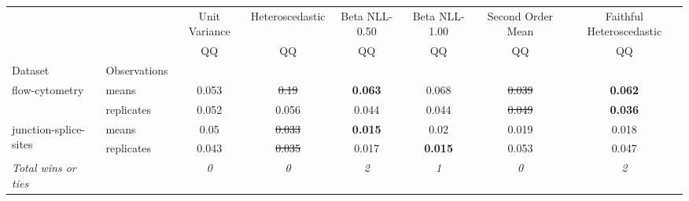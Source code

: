 \begin{tabular}{ll|c|c|c|c|c|c}
\toprule
{} & {} & {Unit Variance} & {Heteroscedastic} & {Beta NLL-0.50} & {Beta NLL-1.00} & {Second Order Mean} & {Faithful Heteroscedastic} \\
{} & {} & {QQ} & {QQ} & {QQ} & {QQ} & {QQ} & {QQ} \\
{Dataset} & {Observations} & {} & {} & {} & {} & {} & {} \\
\midrule
\multirow[t]{2}{*}{flow-cytometry} & means & 0.053 & \sout{0.19} & \textbf{0.063} & 0.068 & \sout{0.039} & \textbf{0.062} \\
 & replicates & 0.052 & 0.056 & 0.044 & 0.044 & \sout{0.049} & \textbf{0.036} \\
\multirow[t]{2}{*}{junction-splice-sites} & means & 0.05 & \sout{0.033} & \textbf{0.015} & 0.02 & 0.019 & 0.018 \\
 & replicates & 0.043 & \sout{0.035} & 0.017 & \textbf{0.015} & 0.053 & 0.047 \\
\textit{{Total wins or ties}} &  & \textit{0} & \textit{0} & \textit{2} & \textit{1} & \textit{0} & \textit{2} \\
\bottomrule
\end{tabular}
